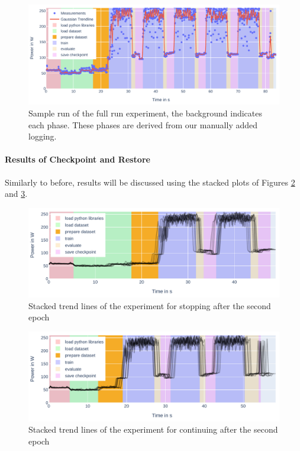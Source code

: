 \begin{figure}[H]
    \includegraphics[width=\linewidth]{power-measurements/measurements_roberta_full_0714010405/plot.pdf}
    \caption{Sample run of the full run experiment, the background indicates each phase. These phases are derived from our manually added logging.}
    \label{fig:plot_full}
\end{figure}

\newpage
\paragraph{Results of Checkpoint and Restore}

Similarly to before, results will be discussed using the stacked plots of Figures \ref{fig:plot_partial_saved_stacked} and \ref{fig:plot_partial_saved_continue_stacked}.

\begin{figure}[H]
    \includegraphics[width=\linewidth]{power-measurements/stacked_plots/roberta_stop_after_saving.pdf}
    \caption{Stacked trend lines of the experiment for stopping after the second epoch}
    \label{fig:plot_partial_saved_stacked}
\end{figure}

\begin{figure}[H]
    \includegraphics[width=\linewidth]{power-measurements/stacked_plots/roberta_continue_after_saving.pdf}
    \caption{Stacked trend lines of the experiment for continuing after the second epoch}
    \label{fig:plot_partial_saved_continue_stacked}
\end{figure}

